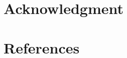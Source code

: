 \documentclass[conference]{IEEEtran}
\begin{document}
%
%

\section*{Acknowledgment}


\section*{References}
\end{document}
